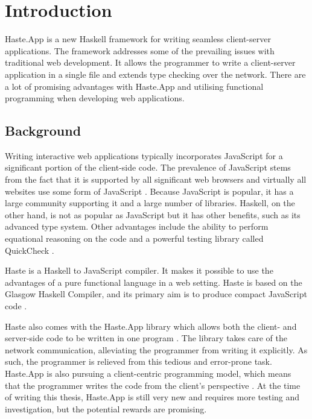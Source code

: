 \documentclass[a4paper]{article}
\begin{document}
\newpage
\listoftodos
\tableofcontents

\newpage

\glsaddall
\printnoidxglossary


\newpage
{}


\section{Introduction}
Haste.App is a new Haskell framework for writing seamless client-server applications. The framework addresses some of the prevailing issues with traditional web development. It allows the programmer to write a client-server application in a single file and extends type checking over the network. There are a lot of promising advantages with Haste.App and utilising functional programming when developing web applications.

\subsection{Background}
Writing interactive web applications typically incorporates JavaScript for a significant portion of the client-side code. The prevalence of JavaScript stems from the fact that it is supported by all significant web browsers and virtually all websites use some form of JavaScript \cite{flanagan2011javascript}. Because JavaScript is popular, it has a large community supporting it and a large number of libraries. Haskell, on the other hand, is not as popular as JavaScript but it has other benefits, such as its advanced type system. Other advantages include the ability to perform equational reasoning on the code \cite{gibbons2011just} and a powerful testing library called QuickCheck \cite{Claessen:2011:QLT:1988042.1988046}.

Haste is a Haskell to JavaScript compiler. It makes it possible to use the advantages of a pure functional language in a web setting. Haste is based on the Glasgow Haskell Compiler, and its primary aim is to produce compact JavaScript code \cite{a-distributed-haskell-for-the-modern-web}.

Haste also comes with the Haste.App library which allows both the client- and server-side code to be written in one program \cite{ekblad2015seamless}. The library takes care of the network communication, alleviating the programmer from writing it explicitly. As such, the programmer is relieved from this tedious and error-prone task. Haste.App is also pursuing a client-centric programming model, which means that the programmer writes the code from the client's perspective \cite{a-distributed-haskell-for-the-modern-web}. At the time of writing this thesis, Haste.App is still very new and requires more testing and investigation, but the potential rewards are promising.
\end{document}
